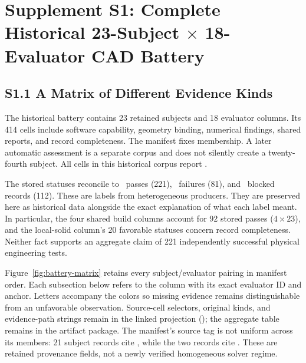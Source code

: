 
\section*{Supplement S1: Complete Historical 23-Subject $\times$ 18-Evaluator CAD Battery}
\label{sup:battery-matrix}

\subsection*{S1.1 A Matrix of Different Evidence Kinds}
The historical battery contains 23 retained subjects and 18 evaluator columns. Its 414 cells include software capability, geometry binding, numerical findings, shared reports, and record completeness. The manifest fixes membership. A later automatic assessment is a separate corpus and does not silently create a twenty-fourth subject. All cells in this historical corpus report .

The stored statuses reconcile to \BatteryPass\ passes (221), \BatteryFail\ failures (81), and \BatteryBlocked\ blocked records (112). These are labels from heterogeneous producers. They are preserved here as historical data alongside the exact explanation of what each label meant. In particular, the four shared build columns account for 92 stored passes ($4 \times 23$), and the local-solid column's 20 favorable statuses concern record completeness. Neither fact supports an aggregate claim of 221 independently successful physical engineering tests.

Figure~\ref{fig:battery-matrix} retains every subject/evaluator pairing in manifest order. Each subsection below refers to the column with its exact evaluator ID and  anchor. Letters accompany the colors so missing evidence remains distinguishable from an unfavorable observation. Source-cell selectors, original kinds, and evidence-path strings remain in the linked projection (); the aggregate table remains in the artifact package. The manifest's source tag is not uniform across its members: 21 subject records cite , while the two  records cite . These are retained provenance fields, not a newly verified homogeneous solver regime.

